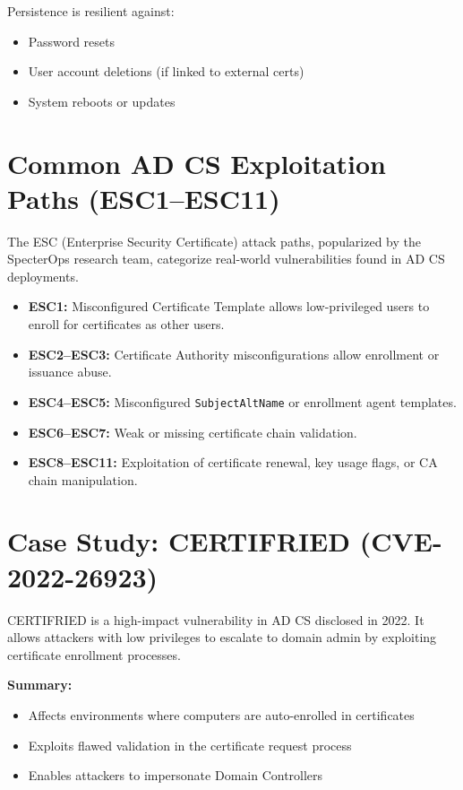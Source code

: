 Persistence is resilient against:
\begin{itemize}
    \item Password resets
    \item User account deletions (if linked to external certs)
    \item System reboots or updates
\end{itemize}

\section{Common AD CS Exploitation Paths (ESC1--ESC11)}

The ESC (Enterprise Security Certificate) attack paths, popularized by the SpecterOps research team, categorize real-world vulnerabilities found in AD CS deployments.

\begin{itemize}
    \item \textbf{ESC1:} Misconfigured Certificate Template allows low-privileged users to enroll for certificates as other users.
    \item \textbf{ESC2--ESC3:} Certificate Authority misconfigurations allow enrollment or issuance abuse.
    \item \textbf{ESC4--ESC5:} Misconfigured \texttt{SubjectAltName} or enrollment agent templates.
    \item \textbf{ESC6--ESC7:} Weak or missing certificate chain validation.
    \item \textbf{ESC8--ESC11:} Exploitation of certificate renewal, key usage flags, or CA chain manipulation.
\end{itemize}

\section{Case Study: CERTIFRIED (CVE-2022-26923)}

CERTIFRIED is a high-impact vulnerability in AD CS disclosed in 2022. It allows attackers with low privileges to escalate to domain admin by exploiting certificate enrollment processes.

\textbf{Summary:}
\begin{itemize}
    \item Affects environments where computers are auto-enrolled in certificates
    \item Exploits flawed validation in the certificate request process
    \item Enables attackers to impersonate Domain Controllers
\end{itemize}

